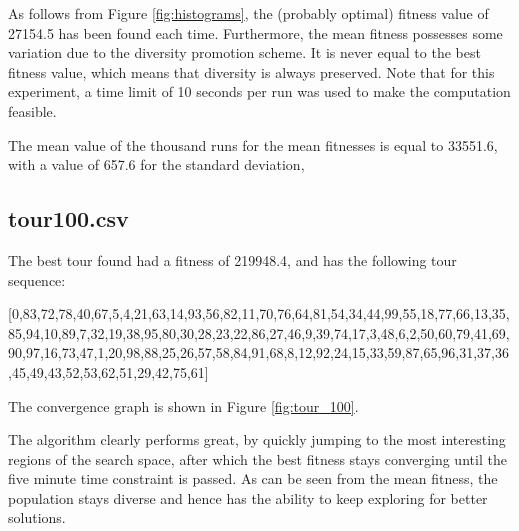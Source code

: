 \documentclass[a4paper,10pt]{article}
\newcommand{\ReplaceMe}[1]{{\color{blue}#1}}
\begin{document}
As follows from Figure \ref{fig:histograms}, the (probably optimal) fitness value of 27154.5 has been found each time. Furthermore, the mean fitness possesses some variation due to the diversity promotion scheme. It is never equal to the best fitness value, which means that diversity is always preserved. Note that for this experiment, a time limit of 10 seconds per run was used to make the computation feasible.

The mean value of the thousand runs for the mean fitnesses is equal to 33551.6, with a value of 657.6 for the standard deviation,



\subsection{tour100.csv}


The best tour found had a fitness of 219948.4, and has the following tour sequence: 

[0,83,72,78,40,67,5,4,21,63,14,93,56,82,11,70,76,64,81,54,34,44,99,55,18,77,66,13,35,85,94,10,89,7,32,19,38,95,80,30,28,23,22,86,27,46,9,39,74,17,3,48,6,2,50,60,79,41,69,90,97,16,73,47,1,20,98,88,25,26,57,58,84,91,68,8,12,92,24,15,33,59,87,65,96,31,37,36,45,49,43,52,53,62,51,29,42,75,61]

The convergence graph is shown in Figure \ref{fig:tour_100}.

The algorithm clearly performs great, by quickly jumping to the most interesting regions of the search space, after which the best fitness stays converging until the five minute time constraint is passed. As can be seen from the mean fitness, the population stays diverse and hence has the ability to keep exploring for better solutions.
\end{document}

